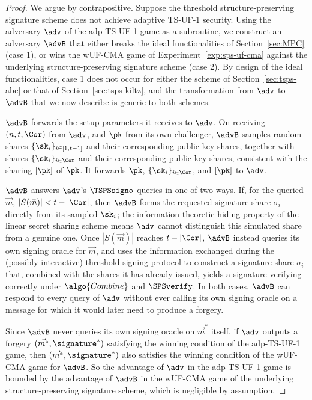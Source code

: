 \begin{proof}

We argue by contrapositive. Suppose the threshold structure-preserving
signature scheme does not achieve adaptive TS-UF-1 security. Using the
adversary $\adv$ of the adp-TS-UF-1 game as a subroutine, we construct an
adversary $\advB$ that either breaks the ideal functionalities of
Section~\ref{sec:MPC} (case 1), or wins the wUF-CMA game of
Experiment~\ref{exp:sps-uf-cma} against the underlying structure-preserving
signature scheme (case 2). By design of the ideal functionalities, case 1 does
not occur for either the scheme of Section~\ref{sec:tsps-abe} or that of
Section~\ref{sec:tsps-kiltz}, and the transformation from $\adv$ to $\advB$
that we now describe is generic to both schemes.

$\advB$ forwards the setup parameters it receives to $\adv$. On receiving $(n,
t, \Cor)$ from $\adv$, and $\pk$ from its own challenger, $\advB$ samples
random shares $\{\sk_i\}_{i \in [1, t-1]}$ and their corresponding public key
shares, together with shares $\{\sk_i\}_{i \in \Cor}$ and their corresponding
public key shares, consistent with the sharing $\lbrack \pk\rbrack $ of $\pk$.
It forwards $\pk$, $\{\sk_i\}_{i \in \Cor}$, and $\lbrack \pk\rbrack $ to
$\adv$.

$\advB$ answers $\adv$'s $\TSPSsigno$ queries in one of two ways. If, for the
queried $\vec{{m}}$, $|S(\vec{{m}})| < t - |\Cor|$, then $\advB$ forms the
requested signature share $\sigma_i$ directly from its sampled $\sk_i$; the
information-theoretic hiding property of the linear secret sharing scheme means
$\adv$ cannot distinguish this simulated share from a genuine one. Once
$|S(\vec{{m}})|$ reaches $t - |\Cor|$, $\advB$ instead queries its own signing
oracle for $\vec{{m}}$, and uses the information exchanged during the (possibly
interactive) threshold signing protocol to construct a signature share
$\sigma_i$ that, combined with the shares it has already issued, yields a
signature verifying correctly under $\algo{Combine}$ and $\SPSverify$. In both
cases, $\advB$ can respond to every query of $\adv$ without ever calling its
own signing oracle on a message for which it would later need to produce a
forgery.

Since $\advB$ never queries its own signing oracle on $\vec{{m}}^*$ itself, if
$\adv$ outputs a forgery $(\vec{{m}^*}, \signature^*)$ satisfying the winning
condition of the adp-TS-UF-1 game, then $(\vec{{m}^*}, \signature^*)$ also
satisfies the winning condition of the wUF-CMA game for $\advB$. So the
advantage of $\adv$ in the adp-TS-UF-1 game is bounded by the advantage of
$\advB$ in the wUF-CMA game of the underlying structure-preserving signature
scheme, which is negligible by assumption.


\end{proof}
